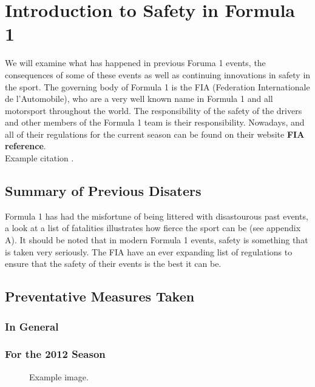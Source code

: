\documentclass[12pt]{article} %
\begin{document}
\section{Introduction to Safety in Formula 1} %

We will examine what has happened in previous Foruma 1 events, the consequences of some of these events as well as
continuing innovations in safety in the sport. The governing body of Formula 1 is the FIA (Federation Internationale de l'Automobile), who are a very well known name in Formula 1 and all motorsport throughout the world. The responsibility of the safety of the drivers and other members of the Formula 1 team is their responsibility. Nowadays, and all of their regulations for the current season can be found on their website {\bf FIA reference}.\\
Example citation \cite{Figueredo:2009dg}.\\


\subsection{Summary of Previous Disaters} %

Formula 1 has had the misfortune of being littered with disastourous past events, a look at a list of fatalities illustrates how fierce the sport can be (see appendix A). It should be noted that in modern Formula 1 events, safety is something that is taken very seriously. The FIA have an ever expanding list of regulations to ensure that the safety of their events is the best it can be.


\subsection{Preventative Measures Taken} %
\subsubsection{In General}
\subsubsection{For the 2012 Season}

\begin{figure}[H] %
\caption{Example image.}
\label{fig:speciation}
\end{figure}
\end{document}

